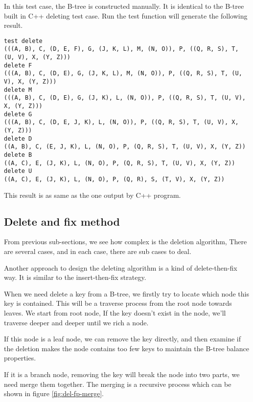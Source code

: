 \documentclass{article}
\begin{document}
In this test case, the B-tree is constructed manually. It is identical to
the B-tree built in C++ deleting test case. Run the test function will
generate the following result.

\begin{verbatim}
test delete
(((A, B), C, (D, E, F), G, (J, K, L), M, (N, O)), P, ((Q, R, S), T, (U, V), X, (Y, Z)))
delete F
(((A, B), C, (D, E), G, (J, K, L), M, (N, O)), P, ((Q, R, S), T, (U, V), X, (Y, Z)))
delete M
(((A, B), C, (D, E), G, (J, K), L, (N, O)), P, ((Q, R, S), T, (U, V), X, (Y, Z)))
delete G
(((A, B), C, (D, E, J, K), L, (N, O)), P, ((Q, R, S), T, (U, V), X, (Y, Z)))
delete D
((A, B), C, (E, J, K), L, (N, O), P, (Q, R, S), T, (U, V), X, (Y, Z))
delete B
((A, C), E, (J, K), L, (N, O), P, (Q, R, S), T, (U, V), X, (Y, Z))
delete U
((A, C), E, (J, K), L, (N, O), P, (Q, R), S, (T, V), X, (Y, Z))
\end{verbatim}

This result is as same as the one output by C++ program.


\subsection{Delete and fix method}

From previous sub-sections, we see how complex is the deletion algorithm,
There are several cases, and in each case, there are sub cases to deal.

Another approach to design the deleting algorithm is a kind of delete-then-fix
way. It is similar to the insert-then-fix strategy.

When we need delete a key from a B-tree, we firstly try to locate
which node this key is contained. This will be a traverse process
from the root node towards leaves. We start from root node, If the 
key doesn't exist in the node, we'll traverse deeper and deeper
until we rich a node.

If this node is a leaf node, we can remove the key directly, and then
examine if the deletion makes the node contains too few keys to 
maintain the B-tree balance properties.

If it is a branch node, removing the key will break the node into
two parts, we need merge them together. The merging is a recursive
process which can be shown in figure \ref{fig:del-fp-merge}.
\end{document}

